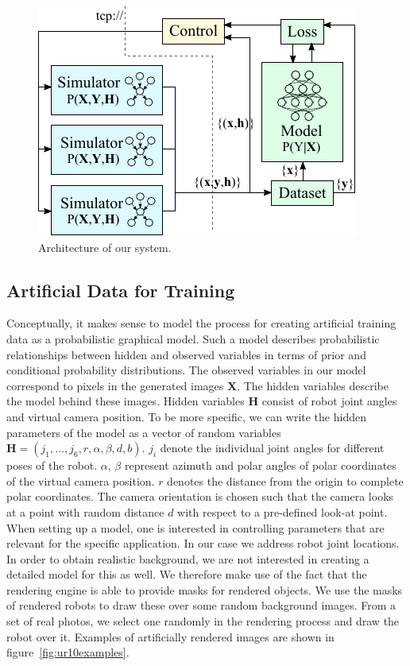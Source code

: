 \documentclass[conference]{IEEEtran}
\begin{document}
    \begin{figure}[htbp]
        \centerline{\includegraphics[width=0.9\columnwidth]{figures/architecture/overview.pdf}}
        \caption{\label{fig:architecture} Architecture of our system.}
    \end{figure}


\subsection{Artificial Data for Training}

    Conceptually, it makes sense to model the process for creating artificial training data as a probabilistic graphical model. Such a model describes probabilistic relationships between hidden and observed variables in terms of prior and conditional probability distributions. The observed variables in our model correspond to pixels in the generated images $\mathbf{X}$. The hidden variables describe the model behind these images. Hidden variables $\mathbf{H}$ consist of robot joint angles and virtual camera position. To be more specific, we can write the hidden parameters of the model as a vector of random variables $\mathbf{H} = (j_1, \dots, j_6, r, \alpha, \beta, d, b)$. $j_i$ denote the individual joint angles for different poses of the robot. $\alpha$, $\beta$  represent azimuth and polar angles of polar coordinates of the virtual camera position. $r$ denotes the distance from the origin to complete polar coordinates. The camera orientation is chosen such that the camera looks at a point with random distance $d$ with respect to a pre-defined look-at point. When setting up a model, one is interested in controlling parameters that are relevant for the specific application. In our case we address robot joint locations. In order to obtain realistic background, we are not interested in creating a detailed model for this as well. We therefore make use of the fact that the rendering engine is able to provide masks for rendered objects. We use the masks of rendered robots to draw these over some random background images. From a set of real photos, we select one randomly in the rendering process and draw the robot over it. Examples of artificially rendered images are shown in figure~\ref{fig:ur10examples}.
    
\end{document}
